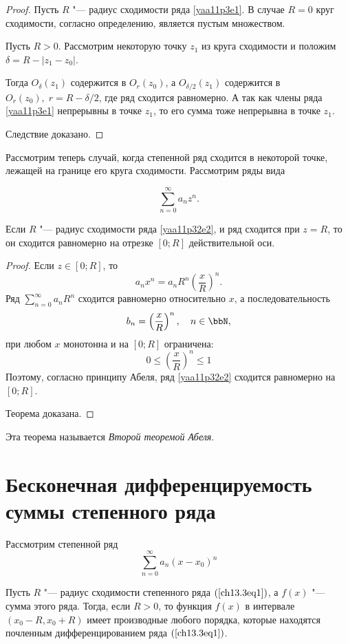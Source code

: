 \begin{proof}
Пусть $R$ "--- радиус сходимости ряда \eqref{yaa11p3e1}. В случае $R=0$ круг сходимости, согласно определению, является пустым множеством.

Пусть $R>0$. Рассмотрим некоторую точку $z_1$ из круга сходимости и положим $\delta=R-|z_1-z_0|$.

Тогда $O_{\delta}(z_1)$ содержится в $O_r(z_0)$, а $O_{\delta /2}(z_1)$ содержится в $O_r(z_0),\; r=R-\delta /2$, где ряд сходится равномерно. А так как члены ряда \eqref{yaa11p3e1} непрерывны в точке $z_1$, то его сумма тоже непрерывна в точке $z_1$.
 
Следствие доказано.
\end{proof}

Рассмотрим теперь случай, когда степенной ряд сходится в некоторой точке, лежащей на границе его круга сходимости. Рассмотрим ряды вида

\begin{equation}\label{yaa11p32e2}
\sum\limits_{n=0}^{\infty} a_nz^n.
\end{equation}

\begin{thm}
Если $R$ "--- радиус сходимости ряда \eqref{yaa11p32e2}, и ряд сходится при $z=R$, то он сходится равномерно на отрезке $[0;R]$ действительной оси.
\end{thm}

\begin{proof}
Если $z\in[0;R]$, то
$$
a_nx^n=a_nR^n\left(\frac{x}{R}\right)^n.
$$
Ряд $\sum\limits_{n=0}^{\infty} a_nR^n$ сходится равномерно относительно $x$, а последовательность
$$
b_n=\left(\frac{x}{R}\right)^n,\quad n\in \bbN,
$$
при любом $x$ монотонна и на $[0;R]$ ограничена:
$$
0\le \left(\frac{x}{R}\right)^n\le 1
$$
Поэтому, согласно принципу Абеля, ряд \eqref{yaa11p32e2} сходится равномерно на $[0;R]$. 

Теорема доказана.
\end{proof}

Эта теорема называется \textit{Второй теоремой Абеля}.


\section{Бесконечная дифференцируемость суммы степенного ряда}
Рассмотрим степенной ряд
\begin{equation} \label{ch13.3eq1}
\sum\limits_{n = 0}^{\infty} a_n (x - x_0)^n
\end{equation}
\begin{thm} \label{ch13.3thm2}
Пусть $R$ "--- радиус сходимости степенного ряда $(\ref{ch13.3eq1})$, а $f(x)$ "--- сумма этого ряда. Тогда, если $R > 0$, то функция $f(x)$ в интервале $(x_0 - R, x_0 + R)$ имеет производные любого порядка, которые находятся почленным дифференцированием ряда $(\ref{ch13.3eq1})$.
\end{thm}

